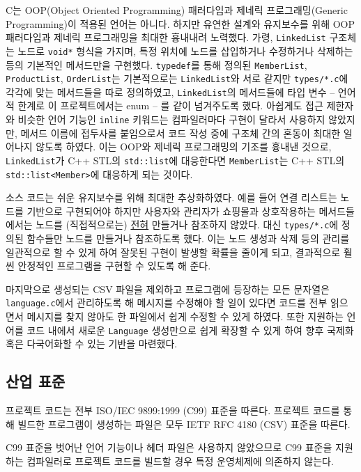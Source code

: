 \documentclass[runningheads]{llncs}
\begin{document}
C는 OOP(Object Oriented Programming) 패러다임과 제네릭 프로그래밍(Generic Programming)이 적용된 언어는 아니다. 하지만 유연한 설계와 유지보수를 위해 OOP 패러다임과 제네릭 프로그래밍을 최대한 흉내내려 노력했다. 가령, \texttt{LinkedList} 구조체는 노드로 \texttt{void*} 형식을 가지며, 특정 위치에 노드를 삽입하거나 수정하거나 삭제하는 등의 기본적인 메서드만을 구현했다. \texttt{typedef}를 통해 정의된 \texttt{MemberList}, \texttt{ProductList}, \texttt{OrderList}는 기본적으로는 \texttt{LinkedList}와 서로 같지만 \texttt{types/*.c}에 각각에 맞는 메서드들을 따로 정의하였고, \texttt{LinkedList}의 메서드들에 타입 변수 -- 언어적 한계로 이 프로젝트에서는 enum -- 를 같이 넘겨주도록 했다. 아쉽게도 접근 제한자와 비슷한 언어 기능인 \texttt{inline} 키워드는 컴파일러마다 구현이 달라서 사용하지 않았지만, 메서드 이름에 접두사를 붙임으로서 코드 작성 중에 구조체 간의 혼동이 최대한 일어나지 않도록 하였다. 이는 OOP와 제네릭 프로그래밍의 기조를 흉내낸 것으로, \texttt{LinkedList}가 C++ STL의 \texttt{std::list}에 대응한다면 \texttt{MemberList}는 C++ STL의 \texttt{std::list<Member>}에 대응하게 되는 것이다.

소스 코드는 쉬운 유지보수를 위해 최대한 추상화하였다. 예를 들어 연결 리스트는 노드를 기반으로 구현되어야 하지만 사용자와 관리자가 쇼핑몰과 상호작용하는 메서드들에서는 노드를 (직접적으로는) \underline{전혀} 만들거나 참조하지 않았다. 대신 \texttt{types/*.c}에 정의된 함수들만 노드를 만들거나 참조하도록 했다. 이는 노드 생성과 삭제 등의 관리를 일관적으로 할 수 있게 하여 잘못된 구현이 발생할 확률을 줄이게 되고, 결과적으로 훨씬 안정적인 프로그램을 구현할 수 있도록 해 준다.

마지막으로 생성되는 CSV 파일을 제외하고 프로그램에 등장하는 모든 문자열은 \texttt{language.c}에서 관리하도록 해 메시지를 수정해야 할 일이 있다면 코드를 전부 읽으면서 메시지를 찾지 않아도 한 파일에서 쉽게 수정할 수 있게 하였다. 또한 지원하는 언어를 코드 내에서 새로운 \texttt{Language} 생성만으로 쉽게 확장할 수 있게 하여 향후 국제화 혹은 다국어화할 수 있는 기반을 마련했다.

\subsection{산업 표준}
프로젝트 코드는 전부 ISO/IEC 9899:1999 (C99) 표준\cite{cstd99}을 따른다. 프로젝트 코드를 통해 빌드한 프로그램이 생성하는 파일은 모두 IETF RFC 4180 (CSV) 표준\cite{rfc4180}을 따른다.

C99 표준을 벗어난 언어 기능이나 헤더 파일은 사용하지 않았으므로 C99 표준을 지원하는 컴파일러로 프로젝트 코드를 빌드할 경우 특정 운영체제에 의존하지 않는다.
\end{document}
